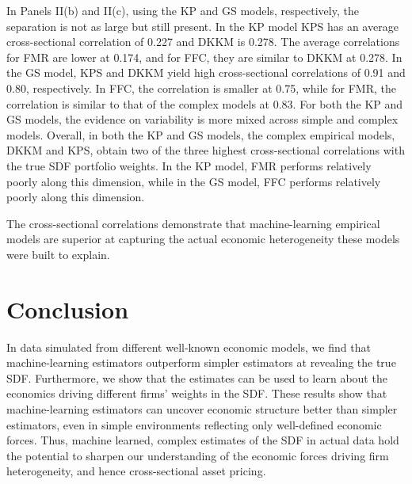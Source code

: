 \documentclass[12pt]{scrarticle}
\begin{document}
In Panels II(b) and II(c), using the KP and GS models, respectively, the separation is not as large but still present. In the KP model KPS has an average cross-sectional correlation of 0.227 and DKKM is 0.278. The average correlations for FMR are lower at 0.174, and for FFC, they are similar to DKKM at 0.278.  In the GS model, KPS and DKKM yield high cross-sectional correlations of 0.91 and 0.80, respectively. In FFC, the correlation is smaller at 0.75, while for FMR, the correlation is similar to that of the complex models at 0.83. For both the KP and GS models, the evidence on variability is more mixed across simple and complex models. Overall, in both the KP and GS models, the complex empirical models, DKKM and KPS, obtain two of the three highest cross-sectional correlations with the true SDF portfolio weights. In the KP model, FMR performs relatively poorly along this dimension, while in the GS model, FFC performs relatively poorly along this dimension.

The cross-sectional correlations demonstrate that machine-learning empirical models are superior at capturing the actual economic heterogeneity these models were built to explain. 


\section{Conclusion}\label{sec:conclusion}

In data simulated from different well-known economic models, we find that machine-learning estimators outperform simpler estimators at revealing the true SDF. Furthermore, we show that the estimates can be used to learn about the economics driving different firms' weights in the SDF. These results show that machine-learning estimators can uncover economic structure better than simpler estimators, even in simple environments reflecting only well-defined economic forces. Thus,  machine learned, complex estimates of the SDF in actual data hold the potential to sharpen our understanding of the economic forces driving firm heterogeneity, and hence cross-sectional asset pricing.
\end{document}
